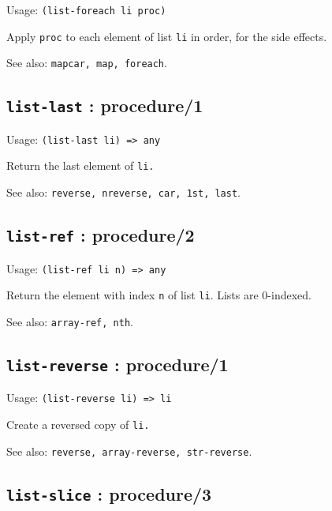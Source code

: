 \documentclass[
]{article}
\newcommand{\passthrough}[1]{#1}
\begin{document}
Usage: \passthrough{\lstinline!(list-foreach li proc)!}

Apply \passthrough{\lstinline!proc!} to each element of list
\passthrough{\lstinline!li!} in order, for the side effects.

See also: \passthrough{\lstinline!mapcar, map, foreach!}.

\hypertarget{list-last-procedure1-1}{%
\subsection{\texorpdfstring{\texttt{list-last} :
procedure/1}{list-last : procedure/1}}\label{list-last-procedure1-1}}

Usage: \passthrough{\lstinline!(list-last li) => any!}

Return the last element of \passthrough{\lstinline!li.!}

See also: \passthrough{\lstinline!reverse, nreverse, car, 1st, last!}.

\hypertarget{list-ref-procedure2-1}{%
\subsection{\texorpdfstring{\texttt{list-ref} :
procedure/2}{list-ref : procedure/2}}\label{list-ref-procedure2-1}}

Usage: \passthrough{\lstinline!(list-ref li n) => any!}

Return the element with index \passthrough{\lstinline!n!} of list
\passthrough{\lstinline!li!}. Lists are 0-indexed.

See also: \passthrough{\lstinline!array-ref, nth!}.

\hypertarget{list-reverse-procedure1-1}{%
\subsection{\texorpdfstring{\texttt{list-reverse} :
procedure/1}{list-reverse : procedure/1}}\label{list-reverse-procedure1-1}}

Usage: \passthrough{\lstinline!(list-reverse li) => li!}

Create a reversed copy of \passthrough{\lstinline!li.!}

See also: \passthrough{\lstinline!reverse, array-reverse, str-reverse!}.

\hypertarget{list-slice-procedure3-1}{%
\subsection{\texorpdfstring{\texttt{list-slice} :
procedure/3}{list-slice : procedure/3}}\label{list-slice-procedure3-1}}
\end{document}
